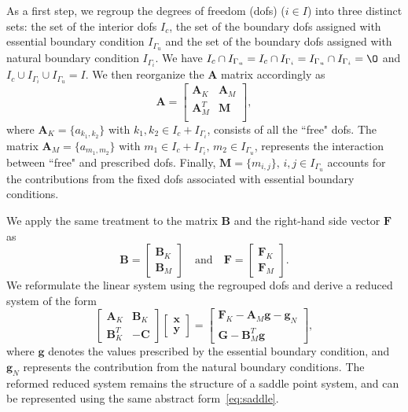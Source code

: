 As a first step, we regroup the degrees of freedom (dofs) ($i\in I$) into three distinct sets: the set of the interior dofs $I_c$, 
the set of the boundary dofs assigned with essential boundary condition $I_{\Gamma_u}$ and the set of the boundary dofs assigned with 
natural boundary condition $I_{\Gamma_i}$. We have $I_c \cap I_{\Gamma_u} = I_c \cap I_{\Gamma_i} 
= I_{\Gamma_u} \cap I_{\Gamma_i} = \O$ and $I_c \cup I_{\Gamma_i} \cup I_{\Gamma_u} = I$.
We then reorganize the $\mathbf{A}$ matrix accordingly as
\begin{equation}\label{eq:full_system}
		  \mathbf{A} = 
		  \begin{bmatrix}
					 \mathbf{A}_K  & \mathbf{A}_M \\
					 \mathbf{A}_M^T & \mathbf{M}  \\
		  \end{bmatrix},
\end{equation}
where $\mathbf{A}_K = \{a_{k_1,k_2}\}$ with $k_1,k_2 \in I_c+I_{\Gamma_i}$, consists of all the ``free" dofs.
The matrix $\mathbf{A}_{M} = \{a_{m_1,m_2}\}$ with $m_1\in I_c+I_{\Gamma_i},\, m_2 \in I_{\Gamma_u}$, represents the 
interaction between ``free" and prescribed dofs.
Finally, $\mathbf{M} = \{m_{i,j}\},\, i,j \in I_{\Gamma_u}$ accounts for the contributions from
the fixed dofs associated with essential boundary conditions.

We apply the same treatment to the matrix $\mathbf{B}$ and the right-hand
side vector $\mathbf{F}$ as
\begin{equation}
		  \mathbf{B} = \begin{bmatrix}
					 \mathbf{B}_K \\
					 \mathbf{B}_M
		  \end{bmatrix}\quad \text{and}\quad \mathbf{F} = \begin{bmatrix}
					 \mathbf{F}_K\\
					 \mathbf{F}_M
		  \end{bmatrix}.
\end{equation}
We reformulate the linear system using the regrouped dofs and derive a reduced system
of the form
\begin{equation}
		  \begin{bmatrix}\label{eq:reducedsaddle}
					 \mathbf{A}_K & \mathbf{B}_K\\
					 \mathbf{B}^T_K & -\mathbf{C}
		  \end{bmatrix} \begin{bmatrix}
					 \mathbf{x} \\
					 \mathbf{y}
		  \end{bmatrix} = \begin{bmatrix}
					 \mathbf{F}_K - \mathbf{A}_M \mathbf{g} - \mathbf{g}_N\\
					 \mathbf{G} - \mathbf{B}_M^T \mathbf{g}
		  \end{bmatrix},
\end{equation}
where $\mathbf{g}$ denotes the values prescribed by the essential 
boundary condition, and $\mathbf{g}_N$ represents the contribution
from the natural boundary conditions.
The reformed reduced system remains the structure of a saddle point
system, and can be represented using the same abstract form~\eqref{eq:saddle}.

